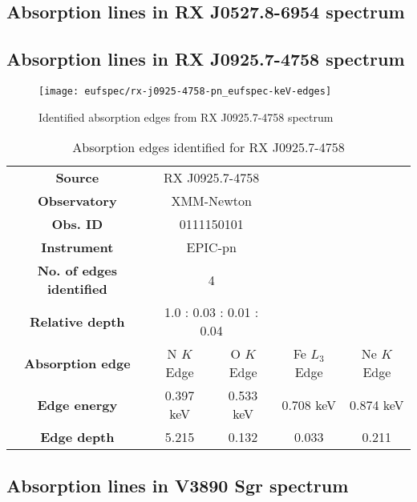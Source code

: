 		\subsection*{Absorption lines in RX J0527.8-6954 spectrum}
		
		\newpage
		\subsection*{Absorption lines in RX J0925.7-4758 spectrum}
			\begin{figure}[h!]
				\centering
				\texttt{[image: eufspec/rx-j0925-4758-pn\_eufspec-keV-edges]}
				\caption{Identified absorption edges from RX J0925.7-4758 spectrum}
				\label{result:absedge-rx-j0925}
			\end{figure}
			
			\renewcommand{\arraystretch}{1.5}
			\begin{table}[!htb]
				\centering
				\caption{Absorption edges identified for RX J0925.7-4758}
				\label{tab:absedge-rx-j0925}
				\begin{tabular}{ccccc}
					\hline
					\textbf{Source} & \multicolumn{2}{c}{RX J0925.7-4758} & {} & {} \\
					\textbf{Observatory} & \multicolumn{2}{c}{XMM-Newton} & {} & {} \\
					\textbf{Obs. ID} & \multicolumn{2}{c}{0111150101} & {} & {} \\
					\textbf{Instrument} & \multicolumn{2}{c}{EPIC-pn} & {} & {} \\
					\textbf{No. of edges identified} & \multicolumn{2}{c}{4} & {} & {} \\
					\textbf{Relative depth} & \multicolumn{2}{c}{1.0 : 0.03 : 0.01 : 0.04} & {} & {} \\ \hline
					\textbf{Absorption edge} & {N $K$ Edge} & {O $K$ Edge} & {Fe $L_3$ Edge} & {Ne $K$ Edge} \\
					\textbf{Edge energy} & {0.397 keV} & {0.533 keV} & {0.708 keV} & {0.874 keV} \\
					\textbf{Edge depth} & {5.215} & {0.132} & {0.033} & {0.211} \\ \hline
				\end{tabular}
			\end{table}
			\renewcommand{\arraystretch}{2.2}
		
		\subsection*{Absorption lines in V3890 Sgr spectrum}
    
